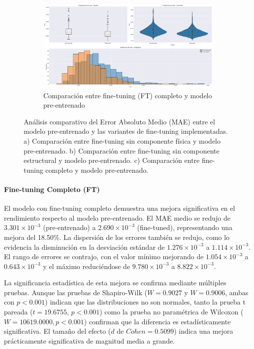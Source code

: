 \begin{figure}[H]
    \begin{subfigure}[b]{0.7\textwidth}
        \centering
        \includegraphics[width=\textwidth]{Images/comparison_plots_mae_sup.png}
        \caption{Comparación entre fine-tuning (FT) completo y modelo pre-entrenado}
        \label{fig:mae_box}
    \end{subfigure}
    
    \caption{Análisis comparativo del Error Absoluto Medio (MAE) entre el modelo pre-entrenado y las variantes de fine-tuning implementadas. a) Comparación entre fine-tuning sin componente física y modelo pre-entrenado. b) Comparación entre fine-tuning sin componente estructural y modelo pre-entrenado. c) Comparación entre fine-tuning completo y modelo pre-entrenado.}
    \label{fig:mae_analysis}
\end{figure}


\paragraph{Fine-tuning Completo (FT)}
El modelo con fine-tuning completo demuestra una mejora significativa en el rendimiento respecto al modelo pre-entrenado. El MAE medio se redujo de $3.301 \times 10^{-3}$ (pre-entrenado) a $2.690 \times 10^{-3}$ (fine-tuned), representando una mejora del 18.50\%. La dispersión de los errores también se redujo, como lo evidencia la disminución en la desviación estándar de $1.276 \times 10^{-3}$ a $1.114 \times 10^{-3}$. El rango de errores se contrajo, con el valor mínimo mejorando de $1.054 \times 10^{-3}$ a $0.643 \times 10^{-3}$ y el máximo reduciéndose de $9.780 \times 10^{-3}$ a $8.822 \times 10^{-3}$.

La significancia estadística de esta mejora se confirma mediante múltiples pruebas. Aunque las pruebas de Shapiro-Wilk ($W = 0.9027$ y $W = 0.9006$, ambas con $p < 0.001$) indican que las distribuciones no son normales, tanto la prueba t pareada ($t = 19.6755$, $p < 0.001$) como la prueba no paramétrica de Wilcoxon ($W = 10619.0000, p < 0.001$) confirman que la diferencia es estadísticamente significativa. El tamaño del efecto ($d$ de $Cohen = 0.5099$) indica una mejora prácticamente significativa de magnitud media a grande.

